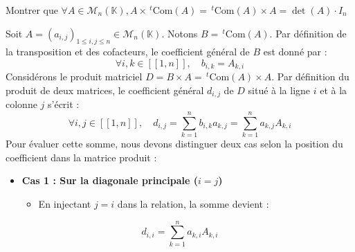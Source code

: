 \documentclass[11pt, a4paper]{article}
\theoremstyle{definition}
\begin{document}
\begin{tcolorbox}[instructionstyle]

Montrer que \( \forall A \in \mathcal M_n(\mathbb K), A \times \,^t\mathrm{Com}(A) = \,^t\mathrm{Com}(A) \times A = \det(A) \cdot I_n \)
\end{tcolorbox}

Soit $A = (a_{i,j})_{1 \le i,j \le n} \in \mathcal{M}_n(\mathbb{K})$. Notons $B = \,^t\mathrm{Com}(A)$. Par définition de la transposition et des cofacteurs, le coefficient général de $B$ est donné par :
\[
\forall i,k \in [\![1,n]\!], \quad b_{i,k} = A_{k,i}
\]
Considérons le produit matriciel $D = B \times A = \,^t\mathrm{Com}(A) \times A$. Par définition du produit de deux matrices, le coefficient général $d_{i,j}$ de $D$ situé à la ligne $i$ et à la colonne $j$ s'écrit :
\[
\forall i,j \in [\![1,n]\!], \quad d_{i,j} = \sum_{k=1}^n b_{i,k} a_{k,j} = \sum_{k=1}^n a_{k,j} A_{k,i}
\]
Pour évaluer cette somme, nous devons distinguer deux cas selon la position du coefficient dans la matrice produit :

\begin{itemize}
\item \textbf{Cas 1 : Sur la diagonale principale ($i = j$)}
\begin{itemize}
\item En injectant $j = i$ dans la relation, la somme devient :
\end{itemize}
\end{itemize}

\[
d_{i,i} = \sum_{k=1}^n a_{k,i} A_{k,i}
\]
\end{document}
